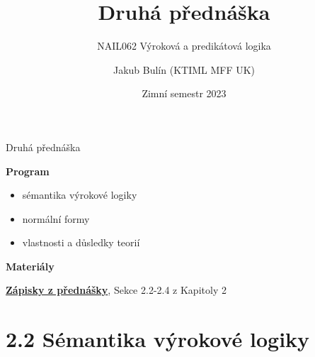 \documentclass{beamer}
\title{Druhá přednáška}
\subtitle{NAIL062 Výroková a predikátová logika}
\author{Jakub Bulín (KTIML MFF UK)}
\date{Zimní semestr 2023}
\begin{document}
\frame{\titlepage}


\begin{frame}{Druhá přednáška}

    \textbf{Program}
        \begin{itemize}
            \item sémantika výrokové logiky
            \item normální formy
            \item vlastnosti a důsledky teorií
        \end{itemize}        
    

    \textbf{Materiály}

        \href{https://github.com/jbulin-mff-uk/nail062/raw/main/lecture/lecture-notes/lecture-notes.pdf}{\alert{\textbf{Zápisky z přednášky}}}, Sekce 2.2-2.4 z Kapitoly 2
    

\end{frame}


\section{2.2 Sémantika výrokové logiky}
\end{document}
